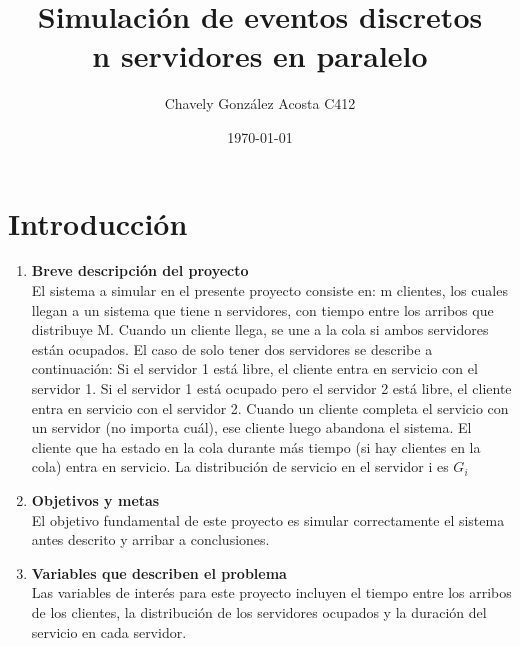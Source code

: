 \documentclass[article]{amsart}
\begin{document}
\thispagestyle{empty}
\title{
	Simulaci\'on de eventos discretos \\
	n servidores en paralelo
}
\author{Chavely Gonz\'alez Acosta C412}
\date{\today}
\maketitle
{}

\newpage


\tableofcontents

\pagestyle{fancy}
\newpage

\section{Introducci\'on}

\begin{enumerate}
\item \textbf{Breve descripción del proyecto} \\
El sistema a simular en el presente proyecto consiste en: m clientes, los cuales llegan a un sistema que tiene n servidores, con tiempo entre los arribos que distribuye M. Cuando un cliente llega, se une a la cola si ambos servidores est\'an ocupados. El caso de solo tener dos servidores se describe a continuaci\'on: Si el servidor 1 est\'a libre, el cliente entra en servicio con el servidor 1. Si el servidor 1 está ocupado pero el servidor 2 está libre, el cliente entra en servicio con el servidor 2. Cuando un cliente completa el servicio con un servidor (no importa cuál), ese cliente luego abandona el sistema. El cliente que ha estado en la cola durante más tiempo (si hay clientes en la cola) entra en servicio. La distribución de servicio en el servidor i es $ G_{i} $\\
\item \textbf{Objetivos y metas} \\
El objetivo fundamental de este proyecto es simular correctamente el sistema antes descrito y arribar a conclusiones.\\
\item \textbf{Variables que describen el problema} \\
 Las variables de interés para este proyecto incluyen el tiempo entre los arribos de los clientes, la distribución de los servidores ocupados y la duración del servicio en cada servidor.\\
\end{enumerate}
\newpage
\end{document}
